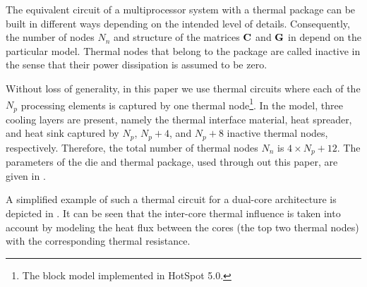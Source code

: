 The equivalent circuit of a multiprocessor system with a thermal package can be built in different ways depending on the intended level of details. Consequently, the number of nodes $N_n$ and structure of the matrices $\mathbf{C}$ and $\mathbf{G}$ in  depend on the particular model. Thermal nodes that belong to the package are called inactive in the sense that their power dissipation is assumed to be zero.

Without loss of generality, in this paper we use thermal circuits where each of the $N_p$ processing elements is captured by one thermal node\footnote{The block model implemented in HotSpot \cite{huang2003} 5.0.}. In the model, three cooling layers are present, namely the thermal interface material, heat spreader, and heat sink captured by $N_p$, $N_p + 4$, and $N_p + 8$ inactive thermal nodes, respectively. Therefore, the total number of thermal nodes $N_n$ is $4 \times N_p + 12$. The parameters of the die and thermal package, used through out this paper, are given in .

A simplified example of such a thermal circuit for a dual-core architecture is depicted in . It can be seen that the inter-core thermal influence is taken into account by modeling the heat flux between the cores (the top two thermal nodes) with the corresponding thermal resistance.

